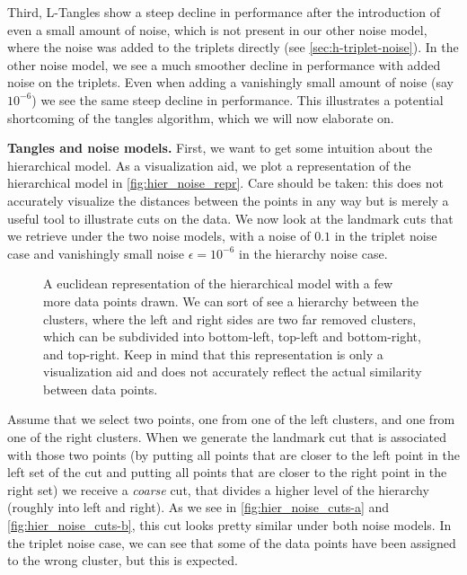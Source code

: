 Third, L-Tangles show a steep decline in performance after the introduction of even a small amount of noise, which is not present in our other noise model, 
where the noise was added to the triplets directly (see \autoref{sec:h-triplet-noise}).
In the other noise model, we see a much smoother decline in performance with added noise on the triplets. 
Even when adding a vanishingly small amount of noise (say $10^{-6}$) we see the same steep decline in performance. 
This illustrates a potential shortcoming of the tangles algorithm, which we will now elaborate on.

\noindent
\textbf{Tangles and noise models.}
First, we want to get some intuition about the hierarchical model.
As a visualization aid, we plot a representation of the hierarchical model in \autoref{fig:hier_noise_repr}. Care should be taken: this does not accurately visualize the distances between
the points in any way but is merely a useful tool to illustrate cuts on the data. We now look at the landmark cuts that we retrieve under the two noise models, with a noise of $0.1$ in the triplet 
noise case and vanishingly small noise $\epsilon = 10^{-6}$ in the hierarchy noise case. 

\begin{figure}[ht]
    \centering
    \resizebox{0.8\textwidth}{!}{}
    \caption{
        A euclidean representation of the hierarchical model with a few more data points drawn. We can sort of see a hierarchy between the clusters, where
        the left and right sides are two far removed clusters, which can be subdivided into bottom-left, top-left and bottom-right, and top-right.
        Keep in mind that this representation is only a visualization aid and does not accurately reflect the actual similarity between data points.
    }
    \label{fig:hier_noise_repr}
\end{figure}


Assume that we select two points, one from one of the left clusters, and one from one of the right clusters. When we generate the landmark cut that is associated with those two points
(by putting all points that are closer to the left point in the left set of the cut and putting all points that are closer to the right point in the right set) 
we receive a \textit{coarse} cut, that divides a higher level of the hierarchy (roughly into left and right). As we see in \autoref{fig:hier_noise_cuts-a} and \autoref{fig:hier_noise_cuts-b}, 
this cut looks pretty similar under both noise models. 
In the triplet noise case, we can see that some of the data points have been assigned to the wrong cluster, but this is expected. 

